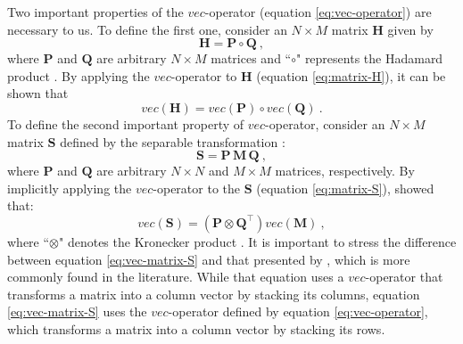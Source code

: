 \documentclass[manuscript,revised]{geophysics}
\begin{document}
Two important properties of the $vec$-operator (equation \ref{eq:vec-operator}) 
are necessary to us. 
To define the first one, consider an 
$N \times M$ matrix $\mathbf{H}$ given by
\begin{equation}
\mathbf{H} = \mathbf{P} \circ \mathbf{Q} \: ,
\label{eq:matrix-H}
\end{equation}
where $\mathbf{P}$ and $\mathbf{Q}$ are arbitrary $N \times M$ matrices and 
``$\circ$" represents the Hadamard product \citep[][ p. 298]{horn_johnson1991}.
By applying the $vec$-operator to $\mathbf{H}$ (equation \ref{eq:matrix-H}), 
it can be shown that
\begin{equation}
vec \left( \mathbf{H} \right) = 
vec \left( \mathbf{P} \right) \circ vec \left( \mathbf{Q} \right) \: .
\label{eq:vec-matrix-H}
\end{equation}
To define the second important property of $vec$-operator, 
consider an $N \times M$ matrix $\mathbf{S}$ defined by 
the separable transformation \citet[][ p. 31]{jain1989}:
\begin{equation}
\mathbf{S} = \mathbf{P \, M \, Q} \: ,
\label{eq:matrix-S}
\end{equation}
where $\mathbf{P}$ and $\mathbf{Q}$ are arbitrary $N \times N$ and $M \times M$ 
matrices, respectively.
By implicitly applying the $vec$-operator to 
the $\mathbf{S}$ (equation \ref{eq:matrix-S}), 
\citet[][ p. 31]{jain1989} showed that:
\begin{equation}
vec \left( \mathbf{S} \right) = 
\left( \mathbf{P} \otimes \mathbf{Q}^{\top} \right) 
vec \left( \mathbf{M} \right) \: ,
\label{eq:vec-matrix-S}
\end{equation}
where ``$\otimes$" denotes the Kronecker product \citep{neudecker1969}.
It is important to stress the difference between equation \ref{eq:vec-matrix-S}
and that presented by \citet{neudecker1969}, which is more commonly found in 
the literature.
While that equation uses a $vec$-operator that transforms a matrix into a column 
vector by stacking its columns, equation \ref{eq:vec-matrix-S} 
uses the $vec$-operator defined by equation \ref{eq:vec-operator}, which 
transforms a matrix into a column vector by stacking its rows.
\end{document}

